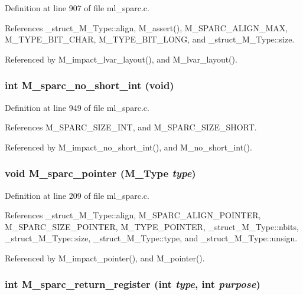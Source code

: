 Definition at line 907 of file ml\_\-sparc.c.

References \_\-struct\_\-M\_\-Type::align, M\_\-assert(), M\_\-SPARC\_\-ALIGN\_\-MAX, M\_\-TYPE\_\-BIT\_\-CHAR, M\_\-TYPE\_\-BIT\_\-LONG, and \_\-struct\_\-M\_\-Type::size.

Referenced by M\_\-impact\_\-lvar\_\-layout(), and M\_\-lvar\_\-layout().
\subsubsection{\setlength{\rightskip}{0pt plus 5cm}int M\_\-sparc\_\-no\_\-short\_\-int (void)}\label{m__sparc_8h_4dbb77ba9cecee885f6f6d61ecbe9efa}




Definition at line 949 of file ml\_\-sparc.c.

References M\_\-SPARC\_\-SIZE\_\-INT, and M\_\-SPARC\_\-SIZE\_\-SHORT.

Referenced by M\_\-impact\_\-no\_\-short\_\-int(), and M\_\-no\_\-short\_\-int().
\subsubsection{\setlength{\rightskip}{0pt plus 5cm}void M\_\-sparc\_\-pointer (\bf{M\_\-Type} {\em type})}\label{m__sparc_8h_cba57ec84028af7a5dba2f293b2ee682}




Definition at line 209 of file ml\_\-sparc.c.

References \_\-struct\_\-M\_\-Type::align, M\_\-SPARC\_\-ALIGN\_\-POINTER, M\_\-SPARC\_\-SIZE\_\-POINTER, M\_\-TYPE\_\-POINTER, \_\-struct\_\-M\_\-Type::nbits, \_\-struct\_\-M\_\-Type::size, \_\-struct\_\-M\_\-Type::type, and \_\-struct\_\-M\_\-Type::unsign.

Referenced by M\_\-impact\_\-pointer(), and M\_\-pointer().
\subsubsection{\setlength{\rightskip}{0pt plus 5cm}int M\_\-sparc\_\-return\_\-register (int {\em type}, int {\em purpose})}\label{m__sparc_8h_2fcf4475e2d7e61a1ef2ae807f28d810}




